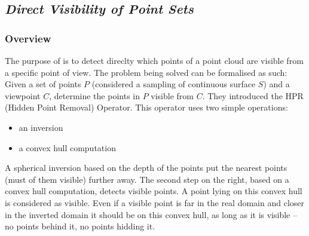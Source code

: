 \subsection{\emph{Direct Visibility of Point Sets}}
\label{subsc:direct}

\subsubsection{Overview}
The purpose of \cite{vis1} is to detect direclty which points of a point cloud are visible from a specific point of view. The problem being solved can be formalised as such: Given a set of points $P$ (considered a sampling of continuous surface $S$) and a viewpoint $C$, determine the points in $P$ visible from $C$. They introduced the HPR (Hidden Point Removal) Operator. This operator uses two simple operations:

\begin{itemize}
  \item an inversion
  \item a convex hull computation
\end{itemize}

A spherical inversion based on the depth of the points put the nearest points (must of them visible) further away. The second step on the right, based on a convex hull computation, detects visible points. A point lying on this convex hull is considered as visible. Even if a visible point is far in the real domain and closer in the inverted domain it should be on this convex hull, as long as it is visible -- no points behind it, no points hidding it.

